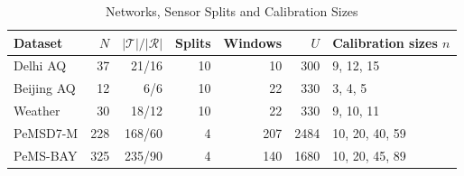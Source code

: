 \begin{table}[htbp]
\caption{Networks, Sensor Splits and Calibration Sizes}
\label{tab:setup}
\centering
\footnotesize
\setlength{\tabcolsep}{3.5pt}
\begin{tabular}{lrrrrrl}
\toprule
\textbf{Dataset} & $N$ & $|\mathcal{T}|/|\mathcal{R}|$ & \textbf{Splits} & \textbf{Windows} & $U$ & \textbf{Calibration sizes $n$} \\
\midrule
Delhi AQ   & 37  & 21/16  & 10 & 10  & 300  & 9, 12, 15 \\
Beijing AQ & 12  & 6/6    & 10 & 22  & 330  & 3, 4, 5 \\
Weather    & 30  & 18/12  & 10 & 22  & 330  & 9, 10, 11 \\
PeMSD7-M   & 228 & 168/60 & 4  & 207 & 2484 & 10, 20, 40, 59 \\
PeMS-BAY   & 325 & 235/90 & 4  & 140 & 1680 & 10, 20, 45, 89 \\
\bottomrule
\end{tabular}
\end{table}
